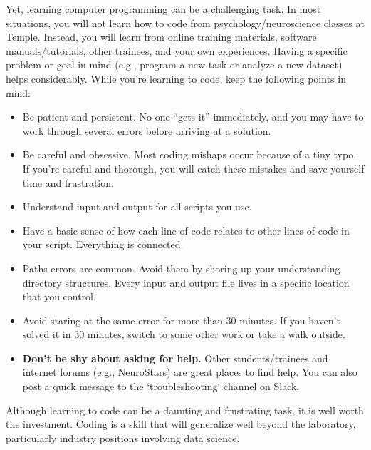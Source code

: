 \documentclass[letterpaper,11pt,oneside]{memoir}
\begin{document}
Yet, learning computer programming can be a challenging task. In most situations, you will not learn how to code from psychology/neuroscience classes at Temple. Instead, you will learn from online training materials, software manuals/tutorials, other trainees, and your own experiences. Having a specific problem or goal in mind (e.g., program a new task or analyze a new dataset) helps considerably. While you're learning to code, keep the following points in mind:

\begin{itemize}

\item Be patient and persistent. No one ``gets it'' immediately, and you may have to work through several errors before arriving at a solution. 
\item Be careful and obsessive. Most coding mishaps occur because of a tiny typo. If you're careful and thorough, you will catch these mistakes and save yourself time and frustration. 
\item Understand input and output for all scripts you use.
\item Have a basic sense of how each line of code relates to other lines of code in your script. Everything is connected. 
\item Paths errors are common. Avoid them by shoring up your understanding directory structures. Every input and output file lives in a specific location that you control. 
\item Avoid staring at the same error for more than 30 minutes. If you haven't solved it in 30 minutes, switch to some other work or take a walk outside.
\item \textbf{Don't be shy about asking for help.} Other students/trainees and internet forums (e.g., NeuroStars) are great places to find help. You can also post a quick message to the `troubleshooting` channel on Slack.

\end{itemize}


\begin{shaded}
\noindent Although learning to code can be a daunting and frustrating task, it is well worth the investment. Coding is a skill that will generalize well beyond the laboratory, particularly industry positions involving data science. 
\end{shaded}
\end{document}
